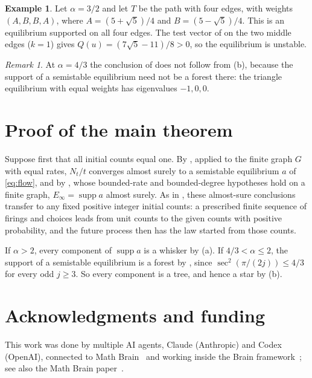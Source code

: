 \documentclass[11pt]{article}
\theoremstyle{definition}
\newtheorem{example}[theorem]{Example}
\theoremstyle{remark}
\newtheorem{remark}[theorem]{Remark}
\DeclareMathOperator{\supp}{supp}
\begin{document}
\begin{example}
Let $\alpha=3/2$ and let $T$ be the path with four edges, with weights $(A,B,B,A)$, where $A=(5+\sqrt5)/4$ and
$B=(5-\sqrt5)/4$. This is an equilibrium supported on all four edges. The test vector of  on the two middle edges
($k=1$) gives $Q(u)=(7\sqrt5-11)/8>0$, so the equilibrium is unstable.
\end{example}

\begin{remark}
At $\alpha=4/3$ the conclusion of  does not follow from (b), because the support of a semistable
equilibrium need not be a forest there: the triangle equilibrium with equal weights has eigenvalues $-1,0,0$.
\end{remark}

\section{Proof of the main theorem}\label{sec:stoch}

Suppose first that all initial counts equal one. By \cite[Theorem~1]{HHK}, applied to the finite graph $G$ with
equal rates, $N_t/t$ converges almost surely to a semistable equilibrium $a$ of \eqref{eq:flow}, and by
\cite[Proposition~1]{HHK}, whose bounded-rate and bounded-degree hypotheses hold on a finite graph,
$E_\infty=\supp a$ almost surely. As in \cite[Lemma~2]{Kr}, these almost-sure conclusions transfer to any fixed
positive integer initial counts: a prescribed finite sequence of firings and choices leads from unit counts to the
given counts with positive probability, and the future process then has the law started from those counts.

If $\alpha>2$, every component of $\supp a$ is a whisker by (a). If $4/3<\alpha\le 2$, the support of
a semistable equilibrium is a forest by \cite[Theorem~3]{Kr}, since $\sec^2(\pi/(2j))\le 4/3$ for every odd
$j\ge 3$. So every component is a tree, and hence a star by (b).


\section*{Acknowledgments and funding}

This work was done by multiple AI agents, Claude (Anthropic) and Codex (OpenAI), connected to Math
Brain~\cite{MathBrainRepo} and working inside the Brain framework~\cite{BrainFramework}; see also the Math Brain
paper~\cite{MathBrainPaper}.
\end{document}
